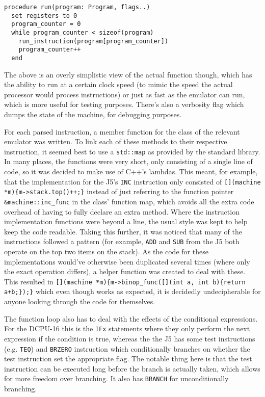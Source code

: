 \begin{lstlisting}[caption={Running a DCPU-16 program}]
procedure run(program: Program, flags..)
  set registers to 0
  program_counter = 0
  while program_counter < sizeof(program)
    run_instruction(program[program_counter])
    program_counter++
  end
\end{lstlisting}

The above is an overly simplistic view of the actual function though, which has
the ability to run at a certain clock speed (to mimic the speed the actual
processor would process instructions) or just as fast as the emulator can run,
which is more useful for testing purposes. There's also a verbosity flag which
dumps the state of the machine, for debugging purposes.

For each parsed instruction, a member function for the class of the relevant
emulator was written. To link each of these methods to their respective
instruction, it seemed best to use a \texttt{std::map} as provided by the
standard library. In many places, the functions were very short, only consisting
of a single line of code, so it was decided to make use of C++'s lambdas. This
meant, for example, that the implementation for the J5's \texttt{INC}
instruction only consisted of
\verb|[](machine *m){m->stack.top()++;}| instead of just referring to the
function pointer \verb|&machine::inc_func| in the class' function map, which
avoids all the extra code overhead of having to fully declare an extra method.
Where the instruction implementation functions were beyond a line, the usual
style was kept to help keep the code readable. Taking this further, it was
noticed that many of the instructions followed a pattern (for example,
\texttt{ADD} and \texttt{SUB} from the J5 both operate on the top two items on
the stack). As the code for these implementations would've otherwise been
duplicated several times (where only the exact operation differs), a helper
function was created to deal with these. This resulted in
\verb|[](machine *m){m->binop_func([](int a, int b){return a+b;});}| which even
though works as expected, it is decidedly undecipherable for anyone looking
through the code for themselves.

The function loop also has to deal with the effects of the conditional
expressions. For the DCPU-16 this is the \lstinline{IFx} statements where they
only perform the next expression if the condition is true, whereas the the J5
has some test instructions (e.g. \lstinline{TEQ}) and \lstinline{BRZERO}
instruction which conditionally branches on whether the test instruction set the
appropriate flag. The notable thing here is that the test instruction can be
executed long before the branch is actually taken, which allows for more freedom
over branching. It also has \lstinline{BRANCH} for unconditionally branching.

